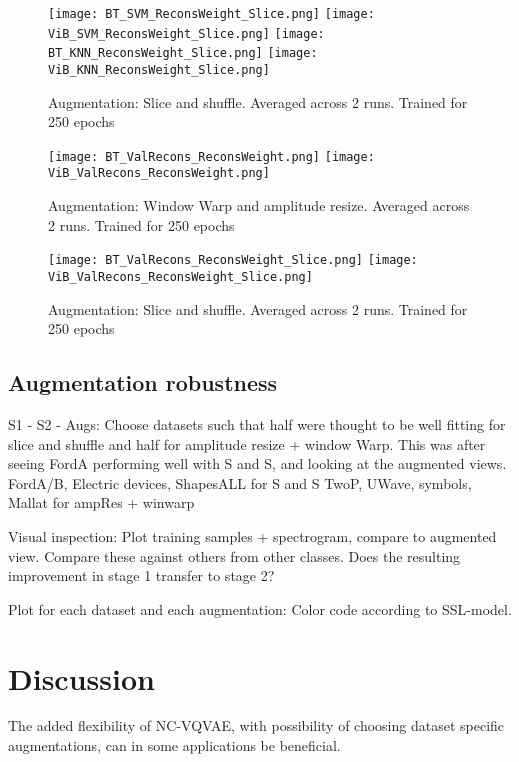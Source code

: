 \documentclass[../../thesis.tex]{subfiles}
\begin{document}
\begin{figure}[h]
    \texttt{[image: BT\_SVM\_ReconsWeight\_Slice.png]}
    \texttt{[image: ViB\_SVM\_ReconsWeight\_Slice.png]}
    \texttt{[image: BT\_KNN\_ReconsWeight\_Slice.png]}
    \texttt{[image: ViB\_KNN\_ReconsWeight\_Slice.png]}

    \caption{Augmentation: Slice and shuffle. Averaged across 2 runs. Trained for 250 epochs}  
\end{figure}

\begin{figure}[h]
    \texttt{[image: BT\_ValRecons\_ReconsWeight.png]}
    \texttt{[image: ViB\_ValRecons\_ReconsWeight.png]}
    \caption{Augmentation: Window Warp and amplitude resize. Averaged across 2 runs. Trained for 250 epochs}  
\end{figure}
\begin{figure}[h]
    \texttt{[image: BT\_ValRecons\_ReconsWeight\_Slice.png]}
    \texttt{[image: ViB\_ValRecons\_ReconsWeight\_Slice.png]}
    \caption{Augmentation: Slice and shuffle. Averaged across 2 runs. Trained for 250 epochs}  
\end{figure}
\subsection{Augmentation robustness}
\label{section:Augmentation robustness}
S1 - S2 - Augs: Choose datasets such that half were thought to be well fitting for slice and shuffle and half for amplitude resize + window Warp. This was after seeing FordA performing well with S and S, and looking at the augmented views.\newline
FordA/B, Electric devices, ShapesALL for S and S\newline
TwoP, UWave, symbols, Mallat for ampRes + winwarp\newline

Visual inspection: Plot training samples + spectrogram, compare to augmented view. Compare these against others from other classes. \newline
Does the resulting improvement in stage 1 transfer to stage 2? 

Plot for each dataset and each augmentation: 
Color code according to SSL-model.
\section{Discussion}
The added flexibility of NC-VQVAE, with possibility of choosing dataset specific augmentations, can in some applications be beneficial.\newline
   
\end{document}
